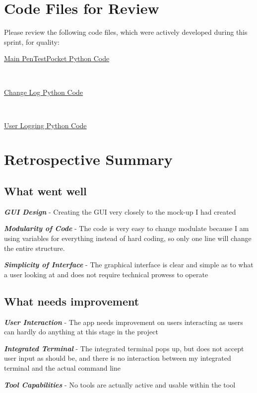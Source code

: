 \documentclass{article}
\begin{document}
\section{Code Files for Review}
Please review the following code files, which were actively developed during this
sprint, for quality:
\begin{center}
\href{https://github.com/zachA214/Adelson\_Senior\_Capstone/blob/main/PenTestPocket/pentestpocket.py}{Main PenTestPocket Python Code} 
\end{center}
\\
\begin{center}
\href{https://github.com/zachA214/Adelson_Senior_Capstone/blob/main/PenTestPocket/changelog.py}{Change Log Python Code}
\end{center}
\\
\begin{center}
\href{https://github.com/zachA214/Adelson_Senior_Capstone/blob/main/PenTestPocket/userlogging.py}{User Logging Python Code}   
\end{center}

\newpage
\section{Retrospective Summary}
\subsection{What went well}
\begin{center}
    \textbf{\textit{GUI Design}} - Creating the GUI very closely to the mock-up I had created
\end{center}
\begin{center}
    \textbf{\textit{Modularity of Code}} - The code is very easy to change modulate because I am using variables for everything instead of hard coding, so only one line will change the entire structure.
\end{center}
\begin{center}
    \textbf{\textit{Simplicity of Interface}} - The graphical interface is clear and simple as to what a user looking at and does not require technical prowess to operate
\end{center}

\subsection{What needs improvement}
\begin{center}
    \textbf{\textit{User Interaction}} - The app needs improvement on users interacting as users can hardly do anything at this stage in the project 
\end{center}
\begin{center}
    \textbf{\textit{Integrated Terminal}} - The integrated terminal pops up, but does not accept user input as should be, and there is no interaction between my integrated terminal and the actual command line
\end{center}
\begin{center}
    \textbf{\textit{Tool Capabilities}} - No tools are actually active and usable within the tool
\end{center}
\end{document}
